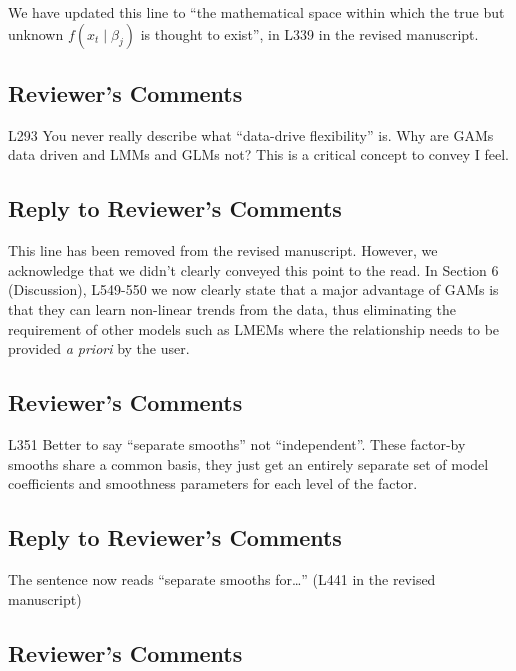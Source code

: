 \documentclass[
]{article}
\begin{document}
We have updated this line to ``the mathematical space within which the true but unknown \(f(x_t\mid \beta_j)\) is thought to exist'', in L339 in the revised manuscript.

\hypertarget{reviewers-comments-23}{%
\subsection{Reviewer's Comments}\label{reviewers-comments-23}}

L293 You never really describe what ``data-drive flexibility'' is. Why are GAMs data driven and LMMs and GLMs not? This is a critical concept to convey I feel.

\hypertarget{section-24}{%
\subsection{\texorpdfstring{\textcolor{reviewersblue} {Reply to Reviewer's Comments}}{}}\label{section-24}}

This line has been removed from the revised manuscript. However, we acknowledge that we didn't clearly conveyed this point to the read. In Section 6 (Discussion), L549-550 we now clearly state that a major advantage of GAMs is that they can learn non-linear trends from the data, thus eliminating the requirement of other models such as LMEMs where the relationship needs to be provided \emph{a priori} by the user.

\hypertarget{reviewers-comments-24}{%
\subsection{Reviewer's Comments}\label{reviewers-comments-24}}

L351 Better to say ``separate smooths'' not ``independent''. These factor-by smooths share a common basis, they just get an entirely separate set of model coefficients and smoothness parameters for each level of the factor.

\hypertarget{section-25}{%
\subsection{\texorpdfstring{\textcolor{reviewersblue} {Reply to Reviewer's Comments}}{}}\label{section-25}}

The sentence now reads ``separate smooths for\ldots{}'' (L441 in the revised manuscript)

\hypertarget{reviewers-comments-25}{%
\subsection{Reviewer's Comments}\label{reviewers-comments-25}}
\end{document}
